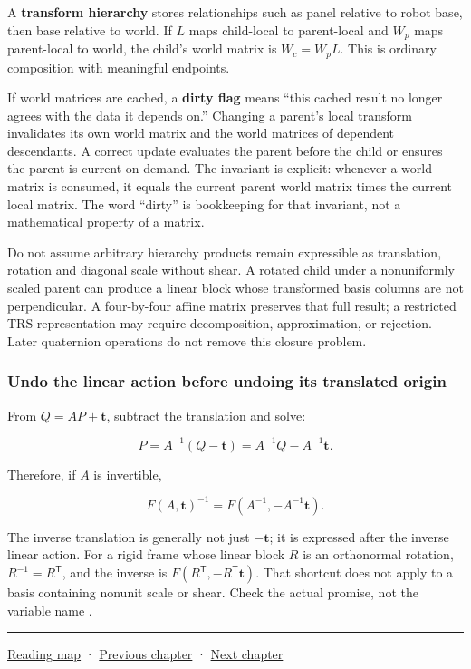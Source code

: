 A \textbf{transform hierarchy} stores relationships such as panel relative to robot base, then base relative to world. If \(L\) maps child-local to parent-local and \(W_p\) maps parent-local to world, the child's world matrix is \(W_c=W_pL\). This is ordinary composition with meaningful endpoints.

If world matrices are cached, a \textbf{dirty flag} means ``this cached result no longer agrees with the data it depends on.'' Changing a parent's local transform invalidates its own world matrix and the world matrices of dependent descendants. A correct update evaluates the parent before the child or ensures the parent is current on demand. The invariant is explicit: whenever a world matrix is consumed, it equals the current parent world matrix times the current local matrix. The word ``dirty'' is bookkeeping for that invariant, not a mathematical property of a matrix.

Do not assume arbitrary hierarchy products remain expressible as translation, rotation and diagonal scale without shear. A rotated child under a nonuniformly scaled parent can produce a linear block whose transformed basis columns are not perpendicular. A four-by-four affine matrix preserves that full result; a restricted TRS representation may require decomposition, approximation, or rejection. Later quaternion operations do not remove this closure problem.

\subsubsection{Undo the linear action before undoing its translated origin}\label{01-foundations-i-ch018-undo-the-linear-action-before-undoing-its-translated-origin}

\hypertarget{01-foundations-i-ch018-undo-the-linear-action-before-undoing-its-translated-origin}{}

From \(Q=AP+\mathbf t\), subtract the translation and solve:

\[
P=A^{-1}(Q-\mathbf t)=A^{-1}Q-A^{-1}\mathbf t.
\]

Therefore, if \(A\) is invertible,

\[
F(A,\mathbf t)^{-1}
=F(A^{-1},-A^{-1}\mathbf t).
\]

The inverse translation is generally not just \(-\mathbf t\); it is expressed after the inverse linear action. For a rigid frame whose linear block \(R\) is an orthonormal rotation, \(R^{-1}=R^{\mathsf T}\), and the inverse is \(F(R^{\mathsf T},-R^{\mathsf T}\mathbf t)\). That shortcut does not apply to a basis containing nonunit scale or shear. Check the actual promise, not the variable name .

\begin{center}\rule{0.5\linewidth}{0.5pt}\end{center}

\hyperref[volume-reading-map]{Reading map} · \hyperref[01-foundations-i-ch017-python-and-numerical-tools-for-graphics-systems]{Previous chapter} · \hyperref[01-foundations-i-ch019-coordinate-frames-and-linear-systems]{Next chapter}
